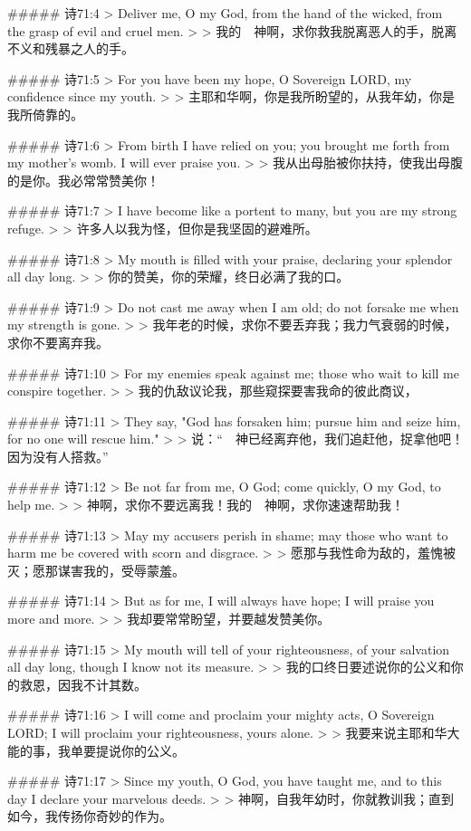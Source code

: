 ##### 诗71:4
> Deliver me, O my God, from the hand of the wicked, from the grasp of evil and cruel men.
>
> 我的　神啊，求你救我脱离恶人的手，脱离不义和残暴之人的手。


##### 诗71:5
> For you have been my hope, O Sovereign LORD, my confidence since my youth.
>
> 主耶和华啊，你是我所盼望的，从我年幼，你是我所倚靠的。


##### 诗71:6
> From birth I have relied on you; you brought me forth from my mother's womb. I will ever praise you.
>
> 我从出母胎被你扶持，使我出母腹的是你。我必常常赞美你！


##### 诗71:7
> I have become like a portent to many, but you are my strong refuge.
>
> 许多人以我为怪，但你是我坚固的避难所。


##### 诗71:8
> My mouth is filled with your praise, declaring your splendor all day long.
>
> 你的赞美，你的荣耀，终日必满了我的口。


##### 诗71:9
> Do not cast me away when I am old; do not forsake me when my strength is gone.
>
> 我年老的时候，求你不要丢弃我；我力气衰弱的时候，求你不要离弃我。


##### 诗71:10
> For my enemies speak against me; those who wait to kill me conspire together.
>
> 我的仇敌议论我，那些窥探要害我命的彼此商议，


##### 诗71:11
> They say, "God has forsaken him; pursue him and seize him, for no one will rescue him."
>
> 说：“　神已经离弃他，我们追赶他，捉拿他吧！因为没有人搭救。”


##### 诗71:12
> Be not far from me, O God; come quickly, O my God, to help me.
>
> 神啊，求你不要远离我！我的　神啊，求你速速帮助我！


##### 诗71:13
> May my accusers perish in shame; may those who want to harm me be covered with scorn and disgrace.
>
> 愿那与我性命为敌的，羞愧被灭；愿那谋害我的，受辱蒙羞。


##### 诗71:14
> But as for me, I will always have hope; I will praise you more and more.
>
> 我却要常常盼望，并要越发赞美你。


##### 诗71:15
> My mouth will tell of your righteousness, of your salvation all day long, though I know not its measure.
>
> 我的口终日要述说你的公义和你的救恩，因我不计其数。


##### 诗71:16
> I will come and proclaim your mighty acts, O Sovereign LORD; I will proclaim your righteousness, yours alone.
>
> 我要来说主耶和华大能的事，我单要提说你的公义。


##### 诗71:17
> Since my youth, O God, you have taught me, and to this day I declare your marvelous deeds.
>
> 神啊，自我年幼时，你就教训我；直到如今，我传扬你奇妙的作为。


